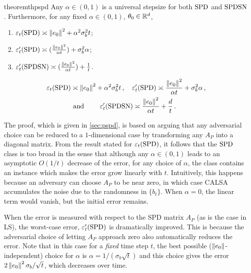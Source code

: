 \begin{restatable}{theorem}{thpspd}\label{th:pspd}
Any $\alpha\in(0,1)$ is a universal stepsize for
both $\mathrm{SPD}$ and $\mathrm{SPDSN}$.
Furthermore, for any fixed $\alpha\in (0,1)$, $\theta_0\in \mathbb{R}^d$, 
\begin{enumerate}[label=(\emph{\roman*}),
topsep=0pt,itemsep=1pt,wide, labelwidth=!, labelindent=0pt]
\item $\varepsilon_t(\mathrm{SPD}) \asymp
\left\| e_0\right\|^2+\alpha^2\sigma_b^2 t$;
\item $\varepsilon_t'(\mathrm{SPD}) \asymp (\frac{\left\| e_0\right\|^2}{\alpha t})+\sigma^2_b\alpha$;
\item $\varepsilon_t'(\mathrm{SPDSN}) \asymp (\frac{\left\| e_0\right\|^2}{\alpha t})+\frac{1}{t}$.
\end{enumerate}
\fi
\begin{align*}
\varepsilon_t(\mathrm{SPD}) &\asymp \left\| e_0\right\|^2+\alpha^2\sigma_b^2 t\,,\quad
\varepsilon_t'(\mathrm{SPD}) \asymp \frac{\left\| e_0\right\|^2}{\alpha t}+\sigma^2_b\alpha\,,\\
&\text{ and }\qquad \varepsilon_t'(\mathrm{SPDSN}) \asymp \frac{\left\| e_0\right\|^2}{\alpha t}+\frac{d}{t}\,.
\end{align*}
\end{restatable}
The proof, which is given in \cref{sec:pspd}, is based on arguing that any adversarial choice can be reduced to a $1$-dimensional case by transforming any $A_P$ into a diagonal matrix.
\fi
From the result stated for $\varepsilon_t(\mathrm{SPD})$, 
it follows that the $\mathrm{SPD}$ class is too broad in the sense that although any $\alpha\in (0,1)$ leads to an asymptotic $O(1/t)$ decrease of the error, for any choice of $\alpha$, the class contains an instance which makes the error grow linearly with $t$. Intuitively, this happens because an adversary can choose $A_P$ to be near zero, in which case CALSA accumulates the noise due to the randomness in $\{b_t\}$. When $\alpha=0$, the linear term would vanish, but the initial error remains. 

When the error is measured with respect to the SPD matrix $A_P$ (as is the case in LS), the worst-case error, $\varepsilon_t'(\mathrm{SPD})$ is dramatically improved. This is because the adversarial choice of letting $A_P$ approach zero also
automatically reduces the error. Note that in this case for a \emph{fixed} time step $t$, the best possible ($\left\| e_0\right\|$-independent)
choice for $\alpha$ is $\alpha = 1/(\sigma_b \sqrt{t})$ and this choice 
gives the error $2\left\| e_0\right\|^2 \sigma_b/\sqrt{t}$, which decreases over time.

